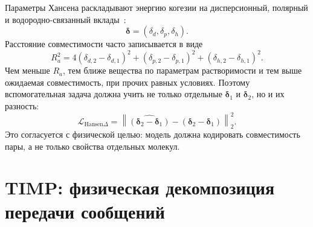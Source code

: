 \documentclass[11pt]{article}
\theoremstyle{definition}
\begin{document}
Параметры Хансена раскладывают энергию когезии на дисперсионный, полярный и водородно-связанный вклады~\cite{hansen2007}:
\begin{equation*}
    \boldsymbol\delta
    =
    (\delta_d,\delta_p,\delta_h).
\end{equation*}
Расстояние совместимости часто записывается в виде
\begin{equation*}
    R_a^2
    =
    4(\delta_{d,2}-\delta_{d,1})^2
    +(\delta_{p,2}-\delta_{p,1})^2
    +(\delta_{h,2}-\delta_{h,1})^2.
\end{equation*}
Чем меньше $R_a$, тем ближе вещества по параметрам растворимости и тем выше ожидаемая совместимость, при прочих равных условиях. Поэтому вспомогательная задача должна учить не только отдельные $\boldsymbol\delta_1$ и $\boldsymbol\delta_2$, но и их разность:
\begin{equation*}
    \mathcal L_{\mathrm{Hansen}\Delta}
    =
    \left\|
    \widehat{(\boldsymbol\delta_2-\boldsymbol\delta_1)}
    -
    (\boldsymbol\delta_2-\boldsymbol\delta_1)
    \right\|_2^2.
\end{equation*}
Это согласуется с физической целью: модель должна кодировать совместимость пары, а не только свойства отдельных молекул.



\section{TIMP: физическая декомпозиция передачи сообщений}
\label{app:timp-math}
\end{document}
